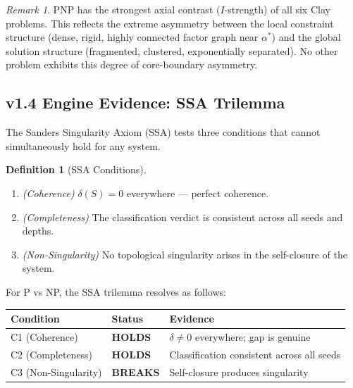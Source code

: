 \documentclass[11pt]{article}
\theoremstyle{definition}
\newtheorem{definition}[theorem]{Definition}
\theoremstyle{remark}
\newtheorem{remark}[theorem]{Remark}
\begin{document}
\begin{remark}
PNP has the strongest axial contrast ($I$-strength) of all six Clay problems.
This reflects the extreme asymmetry between the local constraint structure
(dense, rigid, highly connected factor graph near $\alpha^*$) and the global
solution structure (fragmented, clustered, exponentially separated).  No other
problem exhibits this degree of core-boundary asymmetry.
\end{remark}

\subsection{v1.4 Engine Evidence: SSA Trilemma}
\label{sec:ssa-pnp}

The Sanders Singularity Axiom (SSA) tests three conditions that cannot
simultaneously hold for any system.

\begin{definition}[SSA Conditions]
\label{def:ssa}
\mbox{}
\begin{enumerate}[nosep]
  \item[\textbf{C1}] \emph{(Coherence)} $\delta(S) = 0$ everywhere ---
    perfect coherence.
  \item[\textbf{C2}] \emph{(Completeness)} The classification verdict is
    consistent across all seeds and depths.
  \item[\textbf{C3}] \emph{(Non-Singularity)} No topological singularity
    arises in the self-closure of the system.
\end{enumerate}
\end{definition}

\noindent
For P vs NP, the SSA trilemma resolves as follows:

\begin{center}
\begin{tabular}{@{}lll@{}}
\toprule
\textbf{Condition} & \textbf{Status} & \textbf{Evidence} \\
\midrule
C1 (Coherence) & \textbf{HOLDS} & $\delta \neq 0$ everywhere; gap is genuine \\
C2 (Completeness) & \textbf{HOLDS} & Classification consistent across all seeds \\
C3 (Non-Singularity) & \textbf{BREAKS} & Self-closure produces singularity \\
\bottomrule
\end{tabular}
\end{center}
\end{document}

